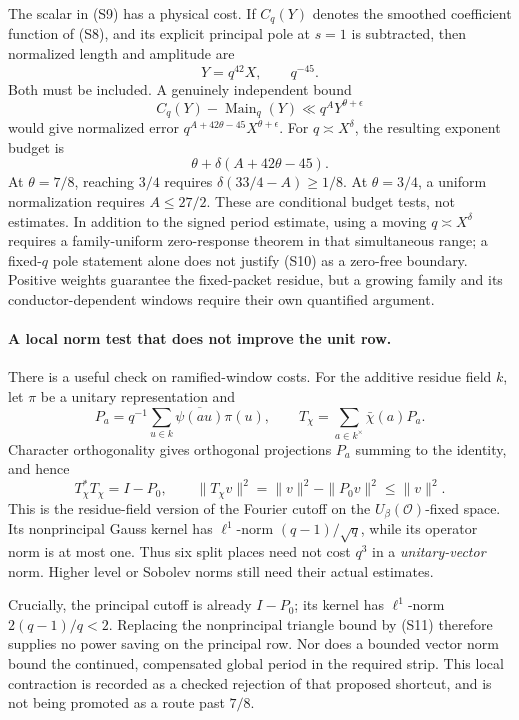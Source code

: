 \documentclass[11pt]{article}
\begin{document}
The scalar in (S9) has a physical cost. If \(C_q(Y)\) denotes the
smoothed coefficient function of (S8), and its explicit principal
pole at \(s=1\) is subtracted, then normalized length and amplitude
are
\[
 Y=q^{42}X,\qquad q^{-45}.
\]
Both must be included. A genuinely independent bound
\[
 C_q(Y)-\operatorname{Main}_q(Y)
       \ll q^A Y^{\theta+\epsilon}
\]
would give normalized error
\(q^{A+42\theta-45}X^{\theta+\epsilon}\).
For \(q\asymp X^\delta\), the resulting exponent budget is
\[
 \theta+\delta(A+42\theta-45).
 \tag{S10}\label{eq:septic-full-budget}
\]
At \(\theta=7/8\), reaching \(3/4\) requires
\(\delta(33/4-A)\ge1/8\).
At \(\theta=3/4\), a uniform normalization requires
\(A\le27/2\).
These are conditional budget tests, not estimates.
In addition to the signed period estimate, using a moving
\(q\asymp X^\delta\) requires a family-uniform zero-response theorem
in that simultaneous range; a fixed-\(q\) pole statement alone does
not justify (S10) as a zero-free boundary.
Positive weights guarantee the fixed-packet residue, but a growing
family and its conductor-dependent windows require their own
quantified argument.

\paragraph{A local norm test that does not improve the unit row.}
There is a useful check on ramified-window costs. For the additive
residue field \(k\), let \(\pi\) be a unitary representation and
\[
 P_a=q^{-1}\sum_{u\in k}\overline{\psi(au)}\pi(u),\qquad
 T_\chi=\sum_{a\in k^\times}\bar\chi(a)P_a .
\]
Character orthogonality gives orthogonal projections \(P_a\) summing
to the identity, and hence
\[
 T_\chi^*T_\chi=I-P_0,\qquad
 \|T_\chi v\|^2=\|v\|^2-\|P_0v\|^2\le\|v\|^2 .
 \tag{S11}
\]
This is the residue-field version of the Fourier cutoff on the
\(U_\beta(\mathcal O)\)-fixed space. Its nonprincipal Gauss kernel
has \(\ell^1\)-norm \((q-1)/\sqrt q\), while its operator norm is at
most one. Thus six split places need not cost \(q^3\) in a
\emph{unitary-vector} norm. Higher level or Sobolev norms still need
their actual estimates.

Crucially, the principal cutoff is already \(I-P_0\); its kernel
has \(\ell^1\)-norm \(2(q-1)/q<2\). Replacing the nonprincipal
triangle bound by (S11) therefore supplies no power saving on the
principal row. Nor does a bounded vector norm bound the continued,
compensated global period in the required strip. This local
contraction is recorded as a checked rejection of that proposed
shortcut, and is not being promoted as a route past \(7/8\).
\end{document}

